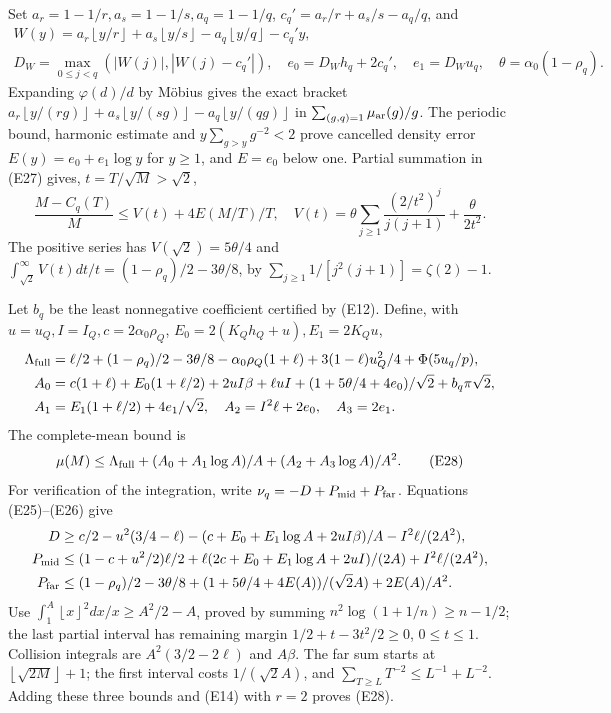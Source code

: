 \documentclass[11pt]{article}
\theoremstyle{definition}\newtheorem{definition}[theorem]{Definition}
\theoremstyle{remark}\newtheorem{remark}[theorem]{Remark}
\newcommand{\floor}[1]{\left\lfloor #1\right\rfloor}
\begin{document}
Set \(a_r=1-1/r,a_s=1-1/s,a_q=1-1/q\),
\(c_q'=a_r/r+a_s/s-a_q/q\), and
\[
\begin{gathered}
 W(y)=a_r\floor{y/r}+a_s\floor{y/s}-a_q\floor{y/q}-c_q'y,\\
 D_W=\max_{0\le j<q}(|W(j)|,|W(j)-c_q'|),\quad
 e_0=D_Wh_q+2c_q',\quad e_1=D_Wu_q,\quad
 \theta=\alpha_0(1-\rho_q).
\end{gathered}
\]
Expanding \(\varphi(d)/d\) by M\"obius gives the exact bracket
\(a_r\floor{y/(rg)}+a_s\floor{y/(sg)}-a_q\floor{y/(qg)}\)
in \(\sum_{(g,q)=1}\mu_{\rm ar}(g)/g\).
The periodic bound, harmonic estimate and
\(y\sum_{g>y}g^{-2}<2\) prove cancelled density error
\(E(y)=e_0+e_1\log y\) for \(y\ge1\), and \(E=e_0\) below one.
Partial summation in (E27) gives, \(t=T/\sqrt M>\sqrt2\),
\[
 \frac{M-C_q(T)}M\le V(t)+4E(M/T)/T,\quad
 V(t)=\theta\sum_{j\ge1}\frac{(2/t^2)^j}{j(j+1)}+\frac{\theta}{2t^2}.
\]
The positive series has \(V(\sqrt2)=5\theta/4\) and
\(\int_{\sqrt2}^\infty V(t)dt/t=(1-\rho_q)/2-3\theta/8\), by
\(\sum_{j\ge1}1/[j^2(j+1)]=\zeta(2)-1\).

Let \(b_q\) be the least nonnegative coefficient certified by (E12).
Define, with \(u=u_Q,I=I_Q,c=2\alpha_0\rho_Q\),
\(E_0=2(K_Qh_Q+u),E_1=2K_Qu\),
\[
\begin{split}
 \Lambda_{\rm full}&=\ell/2+(1-\rho_q)/2-3\theta/8
       -\alpha_0\rho_Q(1+\ell)+3(1-\ell)u_Q^2/4+\Phi(5u_q/p),\\
 A_0&=c(1+\ell)+E_0(1+\ell/2)+2uI\beta+\ell uI
          +(1+5\theta/4+4e_0)/\sqrt2+b_q\pi\sqrt2,\\
 A_1&=E_1(1+\ell/2)+4e_1/\sqrt2,\quad
 A_2=I^2\ell+2e_0,\quad A_3=2e_1 .
\end{split}
\]
The complete-mean bound is
\[
 \mu(M)\le\Lambda_{\rm full}
    +(A_0+A_1\log A)/A+(A_2+A_3\log A)/A^2 .                        \tag{E28}
\]
For verification of the integration, write \(\nu_q=-D+P_{\rm mid}+P_{\rm far}\).
Equations (E25)--(E26) give
\[
\begin{split}
 D&\ge c/2-u^2(3/4-\ell)
 -(c+E_0+E_1\log A+2uI\beta)/A-I^2\ell/(2A^2),\\
 P_{\rm mid}&\le(1-c+u^2/2)\ell/2
 +\ell(2c+E_0+E_1\log A+2uI)/(2A)+I^2\ell/(2A^2),\\
 P_{\rm far}&\le(1-\rho_q)/2-3\theta/8
 +(1+5\theta/4+4E(A))/(\sqrt2A)+2E(A)/A^2.
\end{split}
\]
Use \(\int_1^A\floor x^2dx/x\ge A^2/2-A\), proved by summing
\(n^2\log(1+1/n)\ge n-1/2\); the last partial interval has remaining
margin \(1/2+t-3t^2/2\ge0\), \(0\le t\le1\).
Collision integrals are \(A^2(3/2-2\ell)\) and \(A\beta\).
The far sum starts at \(\floor{\sqrt{2M}}+1\); the first interval
costs \(1/(\sqrt2A)\), and \(\sum_{T\ge L}T^{-2}\le L^{-1}+L^{-2}\).
Adding these three bounds and (E14) with \(r=2\) proves (E28).
\end{document}
